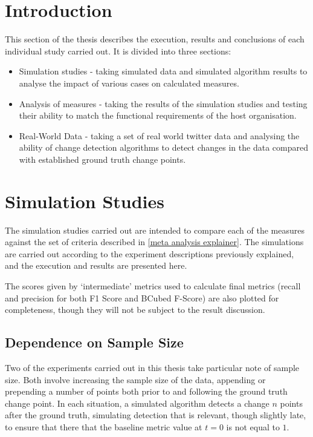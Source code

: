 \documentclass[../main.tex]{subfiles}
\begin{document}
\section{Introduction}

This section of the thesis describes the execution, results and conclusions of each individual study carried out. It is divided into three sections:

\begin{itemize}
    \item Simulation studies - taking simulated data and simulated algorithm results to analyse the impact of various cases on calculated measures.
    \item Analysis of measures - taking the results of the simulation studies and testing their ability to match the functional requirements of the host organisation.
    \item Real-World Data - taking a set of real world twitter data and analysing the ability of change detection algorithms to detect changes in the data compared with established ground truth change points.
\end{itemize}

\section{Simulation Studies}

The simulation studies carried out are intended to compare each of the measures against the set of criteria described in \autoref{meta analysis explainer}. The simulations are carried out according to the experiment descriptions previously explained, and the execution and results are presented here.

The scores given by `intermediate' metrics used to calculate final metrics (recall and precision for both F1 Score and BCubed F-Score) are also plotted for completeness, though they will not be subject to the result discussion.

\subsection{Dependence on Sample Size}
\label{sample size dependence}

Two of the experiments carried out in this thesis take particular note of sample size. Both involve increasing the sample size of the data, appending or prepending a number of points both prior to and following the ground truth change point. In each situation, a simulated algorithm detects a change $n$ points after the ground truth, simulating detection that is relevant, though slightly late, to ensure that there that the baseline metric value at $t = 0$ is not equal to $1$.
\end{document}
